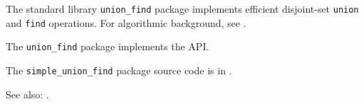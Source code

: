 
The standard library {\tt union\_find} package implements efficient disjoint-set {\tt union} 
and {\tt find} operations.  For algorithmic background, see .

The {\tt union\_find} package implements the  API.

The {\tt simple\_union\_find} package source code is in .

See also:  .





